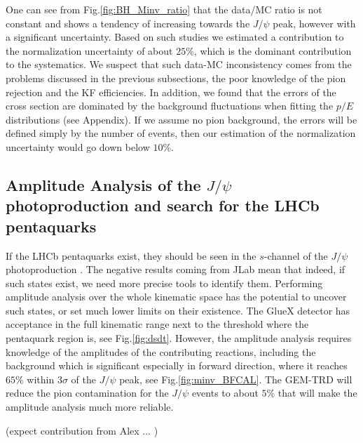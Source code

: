 \documentclass[%
preprint,
nofootinbib,
 amsmath,amssymb,
 aps,
floatfix,
]{revtex4-1}
\begin{document}
One can see from Fig.\ref{fig:BH_Minv_ratio} that the data/MC ratio 
is not constant and shows a tendency of increasing towards the $J/\psi $ peak,
however with a significant uncertainty.
Based on such studies we estimated \cite{prl_gluex} a contribution to the 
normalization uncertainty
of about $25$\%, which is the dominant contribution to the systematics.
We suspect that such data-MC inconsistency comes from the 
problems discussed in the previous subsections, the poor knowledge
of the pion rejection and the KF efficiencies. 
In addition, we found that the errors of the cross section
are dominated by the background fluctuations when fitting
the $p/E$ distributions (see Appendix). 
If we assume no pion background, the errors will be defined 
simply by the number of events, then our estimation of the 
normalization uncertainty would go down below $10$\%.


\subsection{Amplitude Analysis of the $J/\psi $ photoproduction and search
for the LHCb pentaquarks}

If the LHCb pentaquarks \cite{LHCb1,LHCb2} exist, they should be seen in the $s$-channel
of the $J/\psi $ photoproduction \cite{Kubarovsky,Karliner,Blin}.
The negative results coming from JLab \cite{prl_gluex}
mean that indeed, if such states exist, we need more precise tools
to identify them. 
Performing amplitude analysis over the whole kinematic space 
has the potential to uncover such states, or set much lower limits
on their existence.
The GlueX detector has acceptance in the full kinematic range
next to the threshold where the pentaquark region is, see Fig.\ref{fig:dsdt}.
However, the amplitude analysis requires knowledge of the amplitudes
of the contributing reactions, including the background which is significant
especially in forward direction, where it reaches $65$\% within 3$\sigma $ of
the $J/\psi $ peak, see Fig.\ref{fig:minv_BFCAL}.
The GEM-TRD will reduce the pion contamination for the $J/\psi $ events to about $5$\%
that will make the amplitude analysis much more reliable.

(expect contribution from Alex ... )
\end{document}
